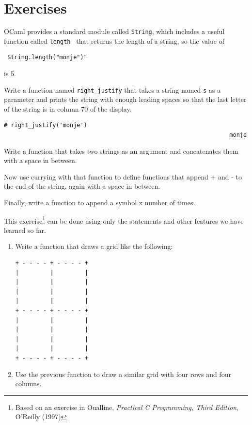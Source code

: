 \documentclass[10pt]{book}
\begin{document}
\section{Exercises}

\begin{ex}


OCaml provides a standard module called {\tt String}, which includes a useful 
function called {\tt length } that returns the length of a string, so the value 
of \begin{verbatim} String.length("monje")" \end{verbatim} is 5.

Write a function named \verb"right_justify" that takes a string
named {\tt s} as a parameter and prints the string with enough
leading spaces so that the last letter of the string is in column 70
of the display.

\beforeverb
\begin{verbatim}
# right_justify('monje')
                                                                 monje
\end{verbatim}
\afterverb

\end{ex}

\begin{ex}
Write a function that takes two strings as an argument and concatenates
them with a space in between.

Now use currying with that function to define functions that append + and - 
to the end of the string, again with a space in between.

Finally, write a function to append a symbol x number of times.

\end{ex}

\begin{ex}
This exercise\footnote{Based on an exercise in Oualline, {\em
    Practical C Programming, Third Edition}, O'Reilly (1997)} can be
done using only the statements and other features we have learned so
far.


\begin{enumerate}

\item Write a function that draws a grid like the
  following:

\beforeverb
\begin{verbatim}
+ - - - - + - - - - +
|         |         |
|         |         |
|         |         |
|         |         |
+ - - - - + - - - - +
|         |         |
|         |         |
|         |         |
|         |         |
+ - - - - + - - - - +
\end{verbatim}
\afterverb
%

\item Use the previous function to draw a similar grid
with four rows and four columns.

\end{enumerate}

\end{ex}
\end{document}
